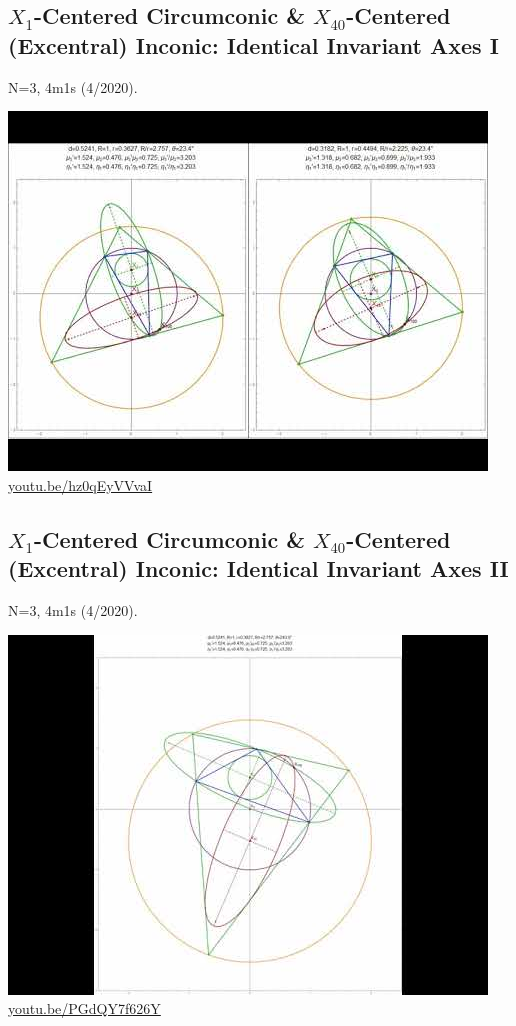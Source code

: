 \documentclass[12pt]{amsart}
\begin{document}
\subsection{$X_{1}$-Centered Circumconic \& $X_{40}$-Centered (Excentral) Inconic: Identical Invariant Axes I}
\label{vid:hz0qEyVVvaI}
\noindent N=3, 4m1s (4/2020). 
\begin{center}\includegraphics[width=.5\textwidth]{pics/hz0qEyVVvaI.jpg} \\ 
\href{https://youtu.be/hz0qEyVVvaI}{\url{youtu.be/hz0qEyVVvaI}}\end{center}
% 
\subsection{$X_{1}$-Centered Circumconic \& $X_{40}$-Centered (Excentral) Inconic: Identical Invariant Axes II}
\label{vid:PGdQY7f626Y}
\noindent N=3, 4m1s (4/2020). 
\begin{center}\includegraphics[width=.5\textwidth]{pics/PGdQY7f626Y.jpg} \\ 
\href{https://youtu.be/PGdQY7f626Y}{\url{youtu.be/PGdQY7f626Y}}\end{center}
% 
\end{document}
